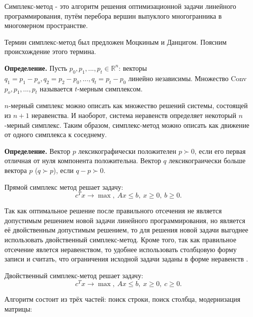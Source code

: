 \documentclass[a4paper,14pt,russian]{extreport}
\begin{document}
Симплекс-метод - это алгоритм решения оптимизационной задачи линейного программирования, путём перебора вершин выпуклого многогранника в многомерном пространстве.
\par Термин симплекс-метод был предложен Моцкиным и Данцигом\cite{dantzig}. Поясним происхождение этого термина. 
\par {\bf Определение.} Пусть $p_0,p_1,...,p_t \in \mathbb{R}^n$: векторы $q_1=p_1-p_o,q_2=p_2-p_0,...,q_t=p_t-p_0$ линейно независимы. Множество Conv{$p_o,p_1,...,p_t$} называется $t$-мерным симплексом. 
\par $n$-мерный симплекс можно описать как множество решений системы, состоящей из $n+1$ неравенства. И наоборот, система неравенств определяет некоторый $n$-мерный симплекс. Таким образом, симплекс-метод можно описать как движение от одного симплекса к соседнему. 
\par {\bf Определение.} Вектор $p$ лексикографически положителен $p \succ 0$, если его первая отличная от нуля компонента положительна. Вектор $q$ лексикограически больше вектора $p$ ($q \succ p$), если $q-p \succ 0$.
\par Прямой симплекс метод решает задачу:
  $$c^Tx \rightarrow \max,~ Ax \le b,~ x \ge 0,~ b \ge 0.$$
\par Так как оптимальное решение после правильного отсечения не является допустимым решением новой задачи линейного программирования, но является её двойственным допустимым решением, то для решения новой задачи выгоднее использовать двойственный симплекс-метод. Кроме того, так как правильное отсечение явлется неравенством, то удобнее использовать столбцовую форму записи и считать, что ограничения исходной задачи заданы в форме неравенств \cite{shevchenko}.
\par Двойственный симплекс-метод решает задачу:
  $$c^Tx \rightarrow \max,~ Ax \le b,~ x \ge 0,~ c \ge 0.$$
\par Алгоритм состоит из трёх частей: поиск строки, поиск столбца, модернизация матрицы:
\end{document}
